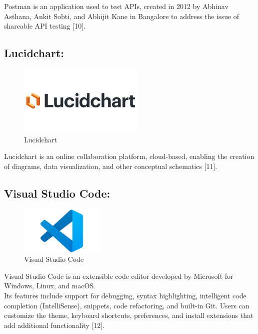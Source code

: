 Postman is an application used to test APIs, created in 2012 by Abhinav Asthana, Ankit Sobti, and Abhijit Kane in Bangalore to address the issue of shareable API testing [10].

\subsection{Lucidchart:}

\begin{figure}[!h]
\begin{center}
\includegraphics[width=6cm]{images/Lucidchart.png}
\end{center}
\caption{Lucidchart}
\end{figure}

Lucidchart is an online collaboration platform, cloud-based, enabling the creation of diagrams, data visualization, and other conceptual schematics [11].

\subsection{Visual Studio Code:}

\begin{figure}[!h]
\begin{center}
\includegraphics[width=4cm]{images/vsc.png}
\end{center}
\caption{Visual Studio Code}
\end{figure}

Visual Studio Code is an extensible code editor developed by Microsoft for Windows, Linux, and macOS.\\

Its features include support for debugging, syntax highlighting, intelligent code completion (IntelliSense), snippets, code refactoring, and built-in Git. Users can customize the theme, keyboard shortcuts, preferences, and install extensions that add additional functionality [12].

